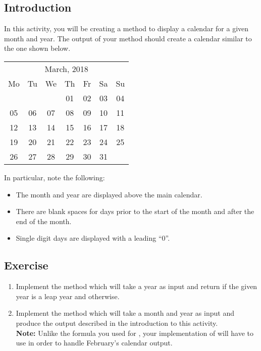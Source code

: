 		\subsection{Introduction}
			In this activity, you will be creating a method to display a calendar for a given month and year. The output of your method should create a calendar similar to the one shown below.
			\begin{center}
				\small
				\begin{tabular}{c c c c c c c}
					\multicolumn{7}{c}{March, 2018}\\
					Mo & Tu & We & Th & Fr & Sa & Su\\
					\ & \ & \ & 01 & 02 & 03 & 04 \\
					05 & 06 & 07 & 08 & 09 & 10 & 11 \\
					12 & 13 & 14 & 15 & 16 & 17 & 18 \\
					19 & 20 & 21 & 22 & 23 & 24 & 25 \\
					26 & 27 & 28 & 29 & 30 & 31
				\end{tabular}
			\end{center}
			In particular, note the following:
			\begin{itemize}
				\item The month and year are displayed above the main calendar.
				\item There are blank spaces for days prior to the start of the month and after the end of the month.
				\item Single digit days are displayed with a leading ``0''.
			\end{itemize}

		\subsection{Exercise}
			\begin{enumerate}
				\item Implement the  method which will take a year as input and return  if the given year is a leap year and  otherwise.
				\item Implement the  method which will take a month and year as input and produce the output described in the introduction to this activity.\\
			{\small\textbf{Note:} Unlike the formula you used for , your implementation of  will have to use  in order to handle February's calendar output.}
			\end{enumerate}

